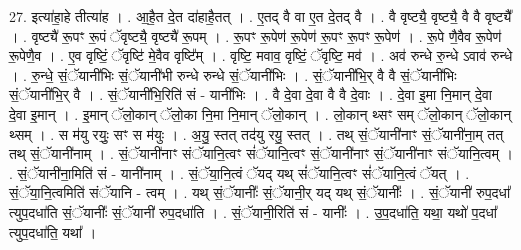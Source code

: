 \documentclass[17pt]{extarticle}
\begin{document}
27. इत्या॑हा॒हे तीत्या॑ह । . आ॒है॒त दे॒त दा॑हाहै॒तत् । . ए॒तद् वै वा ए॒त दे॒तद् वै । . वै वृष्ट्यै॒ वृष्ट्यै॒ वै वै वृष्ट्यै᳚ । . वृष्ट्यै॑ रू॒पꣳ रू॒पं ॅवृष्ट्यै॒ वृष्ट्यै॑ रू॒पम् । . रू॒पꣳ रू॒पेण॑ रू॒पेण॑ रू॒पꣳ रू॒पꣳ रू॒पेण॑ । . रू॒पे णै॒वैव रू॒पेण॑ रू॒पेणै॒व । . ए॒व वृष्टिं॒ ॅवृष्टि॑ मे॒वैव वृष्टि᳚म् । . वृष्टि॒ मवाव॒ वृष्टिं॒ ॅवृष्टि॒ मव॑ । . अव॑ रुन्धे रु॒न्धे ऽवाव॑ रुन्धे । . रु॒न्धे॒ सं॒ॅयानी॑भिः सं॒ॅयानी॑भी रुन्धे रुन्धे सं॒ॅयानी॑भिः । . सं॒ॅयानी॑भि॒र् वै वै सं॒ॅयानी॑भिः सं॒ॅयानी॑भि॒र् वै । . सं॒ॅयानी॑भि॒रिति॑ सं - यानी॑भिः । . वै दे॒वा दे॒वा वै वै दे॒वाः । . दे॒वा इ॒मा नि॒मान् दे॒वा दे॒वा इ॒मान् । . इ॒मान् ॅलो॒कान् ॅलो॒का नि॒मा नि॒मान् ॅलो॒कान् । . लो॒कान् थ्सꣳ सम् ॅलो॒कान् ॅलो॒कान् थ्सम् । . स म॑यु रयुः॒ सꣳ स म॑युः । . अ॒यु॒ स्तत् तद॑यु रयु॒ स्तत् । . तथ् सं॒ॅयानी॑नाꣳ सं॒ॅयानी॑ना॒म् तत् तथ् सं॒ॅयानी॑नाम् । . सं॒ॅयानी॑नाꣳ संॅयानि॒त्वꣳ सं॑ॅयानि॒त्वꣳ सं॒ॅयानी॑नाꣳ सं॒ॅयानी॑नाꣳ संॅयानि॒त्वम् । . सं॒ॅयानी॑ना॒मिति॑ सं - यानी॑नाम् । . सं॒ॅया॒नि॒त्वं ॅयद् यथ् सं॑ॅयानि॒त्वꣳ सं॑ॅयानि॒त्वं ॅयत् । . सं॒ॅया॒नि॒त्वमिति॑ संॅयानि - त्वम् । . यथ् सं॒ॅयानीः᳚ सं॒ॅयानी॒र् यद् यथ् सं॒ॅयानीः᳚ । . सं॒ॅयानी॑ रुप॒दधा᳚ त्युप॒दधा॑ति सं॒ॅयानीः᳚ सं॒ॅयानी॑ रुप॒दधा॑ति । . सं॒ॅयानी॒रिति॑ सं - यानीः᳚ । . उ॒प॒दधा॑ति॒ यथा॒ यथो॑ प॒दधा᳚ त्युप॒दधा॑ति॒ यथा᳚ । \newline
\end{document}
